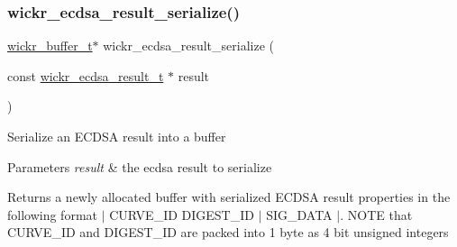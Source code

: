 \subsubsection{\texorpdfstring{wickr\+\_\+ecdsa\+\_\+result\+\_\+serialize()}{wickr\_ecdsa\_result\_serialize()}}
{\footnotesize\ttfamily \hyperlink{structwickr__buffer}{wickr\+\_\+buffer\+\_\+t}$\ast$ wickr\+\_\+ecdsa\+\_\+result\+\_\+serialize (\begin{DoxyParamCaption}\item[{const \hyperlink{structwickr__ecdsa__result}{wickr\+\_\+ecdsa\+\_\+result\+\_\+t} $\ast$}]{result }\end{DoxyParamCaption})}

Serialize an E\+C\+D\+SA result into a buffer


\begin{DoxyParams}{Parameters}
{\em result} & the ecdsa result to serialize \\
\hline
\end{DoxyParams}
\begin{DoxyReturn}{Returns}
a newly allocated buffer with serialized E\+C\+D\+SA result properties in the following format $\vert$ C\+U\+R\+V\+E\+\_\+\+ID D\+I\+G\+E\+S\+T\+\_\+\+ID $\vert$ S\+I\+G\+\_\+\+D\+A\+TA $\vert$. N\+O\+TE that C\+U\+R\+V\+E\+\_\+\+ID and D\+I\+G\+E\+S\+T\+\_\+\+ID are packed into 1 byte as 4 bit unsigned integers 
\end{DoxyReturn}
